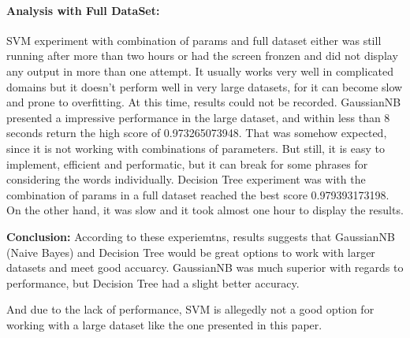 \documentclass[11pt]{article}
\begin{document}
\begin{multicols}{2}
\paragraph{Analysis with Full
DataSet:}\label{analysis-with-full-dataset}

SVM experiment with combination of params and full dataset either was
still running after more than two hours or had the screen fronzen and
did not display any output in more than one attempt. It usually works
very well in complicated domains but it doesn't perform well in very
large datasets, for it can become slow and prone to overfitting. At this
time, results could not be recorded. GaussianNB presented a impressive
performance in the large dataset, and within less than 8 seconds return
the high score of 0.973265073948. That was somehow expected, since it is
not working with combinations of parameters. But still, it is easy to
implement, efficient and performatic, but it can break for some phrases
for considering the words individually. Decision Tree experiment was
with the combination of params in a full dataset reached the best score
0.979393173198. On the other hand, it was slow and it took almost one
hour to display the results.

\textbf{Conclusion:} According to these experiemtns, results suggests
that GaussianNB (Naive Bayes) and Decision Tree would be great options
to work with larger datasets and meet good accuarcy. GaussianNB was much
superior with regards to performance, but Decision Tree had a slight
better accuracy.

And due to the lack of performance, SVM is allegedly not a good option
for working with a large dataset like the one presented in this paper.


    
    



    \end{multicols}
    
\end{document}
